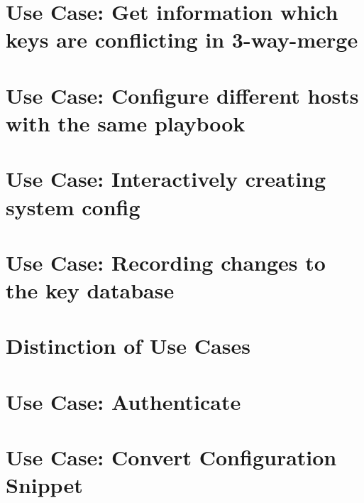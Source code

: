 \let\mypdfximage\pdfximage\def\pdfximage{\immediate\mypdfximage}\documentclass[twoside]{book}
\newcommand{\+}{\discretionary{\mbox{\scriptsize$\hookleftarrow$}}{}{}}
\begin{document}
\chapter{Use Case\+: Get information which keys are conflicting in 3-\/way-\/merge}
\label{doc_usecases_record_elektra_UC_cmerge_conflict_keys_md}

\chapter{Use Case\+: Configure different hosts with the same playbook}
\label{doc_usecases_record_elektra_UC_different_hosts_md}

\chapter{Use Case\+: Interactively creating system config}
\label{doc_usecases_record_elektra_UC_interactive_configuration_md}

\chapter{Use Case\+: Recording changes to the key database}
\label{doc_usecases_record_elektra_UC_record_changes_md}

\chapter{Distinction of Use Cases}
\label{doc_usecases_snippet_sharing_distinction_use_cases_md}

\chapter{Use Case\+: Authenticate}
\label{doc_usecases_snippet_sharing_UC_authenticate_md}

\chapter{Use Case\+: Convert Configuration Snippet}
\label{doc_usecases_snippet_sharing_UC_convert_snippet_md}

\end{document}
